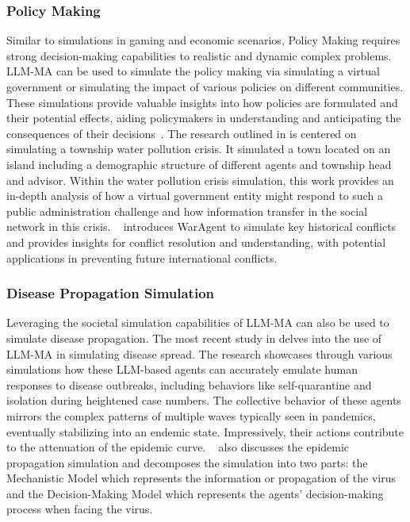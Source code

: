 \subsubsection{Policy Making}
Similar to simulations in gaming and economic scenarios, Policy Making requires strong decision-making capabilities to realistic and dynamic complex problems. LLM-MA can be used to simulate the policy making via simulating a virtual government or simulating the impact of various policies on different communities. These simulations provide valuable insights into how policies are formulated and their potential effects, aiding policymakers in understanding and anticipating the consequences of their decisions~\cite{policy}.
The research outlined in  \cite{xiao2023simulating} is centered on simulating a township water pollution crisis. It simulated a town located on an island including a demographic structure of different agents and township head and advisor. Within the water pollution crisis simulation, this work provides an in-depth analysis of how a virtual government entity might respond to such a public administration challenge and how information transfer in the social network in this crisis. ~\cite{hua2023war} introduces WarAgent to simulate key historical conflicts and provides insights for conflict resolution and understanding, with potential applications in preventing future international conflicts.


\subsubsection{Disease Propagation Simulation}
Leveraging the societal simulation capabilities of LLM-MA can also be used to simulate disease propagation.
The most recent study in \cite{williams2023epidemic} delves into the use of LLM-MA in simulating disease spread. 
The research showcases through various simulations how these LLM-based agents can accurately emulate human responses to disease outbreaks, including behaviors like self-quarantine and isolation during heightened case numbers. 
The collective behavior of these agents mirrors the complex patterns of multiple waves typically seen in pandemics, eventually stabilizing into an endemic state. 
Impressively, their actions contribute to the attenuation of the epidemic curve. 
~\cite{ghaffarzadegan2023generative} also discusses the epidemic propagation simulation and decomposes the simulation into two parts: the Mechanistic Model which represents the information or propagation of the virus and the Decision-Making Model which represents the agents' decision-making process when facing the virus.


